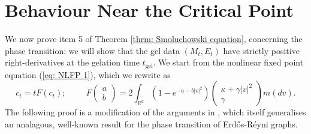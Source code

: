 \documentclass[11pt, notitlepage]{article}
\begin{document}
\section{\textbf{Behaviour Near the Critical Point}}\label{sec: BNCP} We now prove item 5 of Theorem \ref{thrm: Smoluchowski equation}, concerning the phase transition: we will show that the gel data $(M_t, E_t)$ have strictly positive right-derivatives at the gelation time $t_\mathrm{gel}$. We start from the nonlinear fixed point equation (\ref{eq: NLFP 1}), which we rewrite as \begin{equation}\label{eq: NLPF again}c_t=tF(c_t); \hspace{1cm} F\left(\begin{matrix} a \\ b \end{matrix}\right)=2\int_{\mathbb{R}^d}(1-e^{-a-b|v|^2})\left(\begin{matrix}\kappa+\gamma|v|^2 \\ \gamma  \end{matrix}\right)m(dv). \end{equation} The following proof is a modification of the arguments in \cite[Theorem 3.17]{BJR07}, which itself generalises an analagous, well-known result for the phase transition of Erd\H{o}s-R\'eyni graphs.
\end{document}
